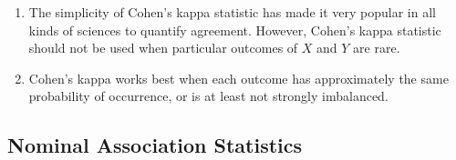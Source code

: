 \begin{enumerate}
    \item The simplicity of Cohen’s kappa statistic has made it very popular in all kinds of sciences to quantify agreement. 
    However, Cohen’s kappa statistic should not be used when particular outcomes of $X$ and $Y$ are rare.
    \hfill \cite{statistics/book/Statistics-for-Data-Scientists/Maurits-Kaptein}

    \item Cohen’s kappa works best when each outcome has approximately the same probability of occurrence, or is at least not strongly imbalanced.
    \hfill \cite{statistics/book/Statistics-for-Data-Scientists/Maurits-Kaptein}
\end{enumerate}







\subsection{Nominal Association Statistics}

